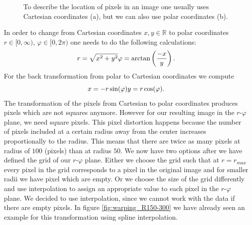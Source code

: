 \begin{figure}[H]
	\centering
\caption{To describe the location of pixels in an image one usually uses Cartesian coordinates (a), but we can also use polar coordinates (b).}
\label{fig:CoorinateSystems}
\end{figure}
In order to change from Cartesian coordinates $x, y \in \mathbb{R}$ to polar coordinates $r \in [0, \infty)$, $\varphi \in [0, 2\pi)$ one needs to do the following calculations:
\begin{equation}
	r = \sqrt{x^2 + y^2}\\
	\varphi = \arctan \left( \frac{-x}{y} \right).
\end{equation}
For the back transformation from polar to Cartesian coordinates we compute
\begin{equation}
	x = -r \sin(\varphi)\\
	y = r \cos(\varphi).
\end{equation}
The transformation of the pixels from Cartesian to polar coordinates produces pixels which are not squares anymore. However for our resulting image in the $r$-$\varphi$ plane, we need square pixels. This pixel distortion happens because the number of pixels included at a certain radius away from the center increases proportionally to the radius. This means that there are twice as many pixels at radius of $100$ (pixels) than at radius $50$. We now have two options after we have defined the grid of our $r$-$\varphi$ plane. Either we choose the grid such that at $r=r_{max}$ every pixel in the grid corresponds to a pixel in the original image and for smaller radii we have pixel which are empty. Or we choose the size of the grid differently and use interpolation to assign an appropriate value to each pixel in the $r$-$\varphi$ plane. We decided to use interpolation, since we cannot work with the data if there are empty pixels. In figure \ref{fig:warping_R150-300} we have already seen an example for this transformation using spline interpolation.\\
